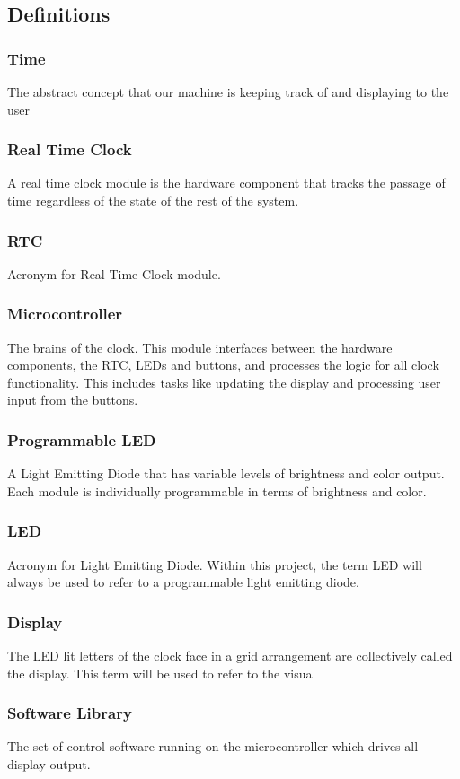 \documentclass[10pt,draftclsnofoot,onecolumn]{IEEEtran}
\begin{document}
\subsection{Definitions}
\subsubsection {Time} The abstract concept that our machine is keeping track of and displaying to the user
\subsubsection {Real Time Clock} A real time clock module is the hardware component that tracks the passage
of time regardless of the state of the rest of the system.
\subsubsection {RTC} Acronym for Real Time Clock module.
\subsubsection {Microcontroller} The brains of the clock. This module interfaces between the hardware
components, the RTC, LEDs and buttons, and processes the logic for all clock functionality.
This includes tasks like updating the display and processing user input from the buttons.
\subsubsection {Programmable LED} A Light Emitting Diode that has variable levels of brightness and
color output. Each module is individually programmable in terms of brightness and color.
\subsubsection {LED} Acronym for Light Emitting Diode. Within this project, the term LED will always
be used to refer to a programmable light emitting diode.
\subsubsection {Display} The LED lit letters of the clock face in a grid arrangement are collectively
called the display. This term will be used to refer to the visual
\subsubsection {Software Library} The set of control software running on the microcontroller which drives all display output.
\end{document}
